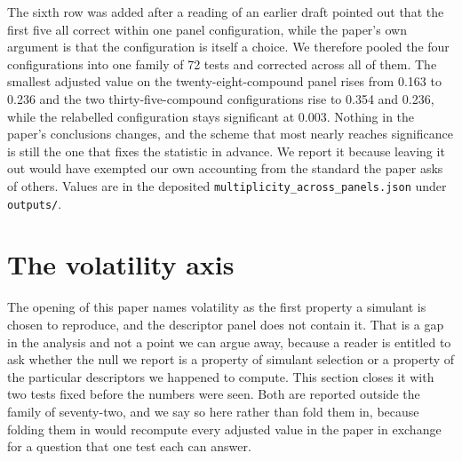 \documentclass[journal=jacsat,manuscript=suppinfo,margin=1in]{achemso}
\begin{document}
The sixth row was added after a reading of an earlier draft pointed out that
the first five all correct within one panel configuration, while the paper's own
argument is that the configuration is itself a choice. We therefore pooled the
four configurations into one family of 72 tests and corrected across all of
them. The smallest adjusted value on the twenty-eight-compound panel rises from
0.163 to 0.236 and the two thirty-five-compound configurations rise to 0.354 and
0.236, while the relabelled configuration stays significant at 0.003. Nothing in
the paper's conclusions changes, and the scheme that most nearly reaches
significance is still the one that fixes the statistic in advance. We report it
because leaving it out would have exempted our own accounting from the standard
the paper asks of others. Values are in the deposited
\texttt{multiplicity\_across\_panels.json} under \texttt{outputs/}.

\section{The volatility axis}
\label{res:volatility}

The opening of this paper names volatility as the first property a simulant is
chosen to reproduce, and the descriptor panel does not contain it. That is a
gap in the analysis and not a point we can argue away, because a reader is
entitled to ask whether the null we report is a property of simulant selection
or a property of the particular descriptors we happened to compute. This
section closes it with two tests fixed before the numbers were seen. Both are
reported outside the family of seventy-two, and we say so here rather than
fold them in, because folding them in would recompute every adjusted value in
the paper in exchange for a question that one test each can answer.
\end{document}

